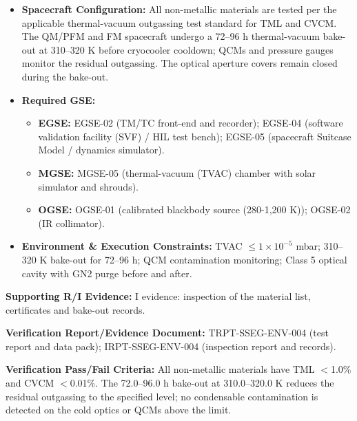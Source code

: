 \begin{itemize}
\item \textbf{Spacecraft Configuration:} All non-metallic materials are tested per the applicable thermal-vacuum outgassing test standard for TML and CVCM. The QM/PFM and FM spacecraft undergo a 72--96 h thermal-vacuum bake-out at 310--320 K before cryocooler cooldown; QCMs and pressure gauges monitor the residual outgassing. The optical aperture covers remain closed during the bake-out.
\item \textbf{Required GSE:}
\begin{itemize}
\item \textbf{EGSE:} EGSE-02 (TM/TC front-end and recorder); EGSE-04 (software validation facility (SVF) / HIL test bench); EGSE-05 (spacecraft Suitcase Model / dynamics simulator).
\item \textbf{MGSE:} MGSE-05 (thermal-vacuum (TVAC) chamber with solar simulator and shrouds).
\item \textbf{OGSE:} OGSE-01 (calibrated blackbody source (280-1,200 K)); OGSE-02 (IR collimator).
\end{itemize}
\item \textbf{Environment \& Execution Constraints:} TVAC $\le$$1\times10^{-5}$ mbar; 310--320 K bake-out for 72--96 h; QCM contamination monitoring; Class 5 optical cavity with GN2 purge before and after.
\end{itemize}
\par\textbf{Supporting R/I Evidence:} I evidence: inspection of the material list, certificates and bake-out records.
\par\textbf{Verification Report/Evidence Document:} TRPT-SSEG-ENV-004 (test report and data pack); IRPT-SSEG-ENV-004 (inspection report and records).
\par\textbf{Verification Pass/Fail Criteria:} All non-metallic materials have TML $<$1.0\% and CVCM $<$0.01\%. The 72.0--96.0 h bake-out at 310.0--320.0 K reduces the residual outgassing to the specified level; no condensable contamination is detected on the cold optics or QCMs above the limit.
\par\medskip
